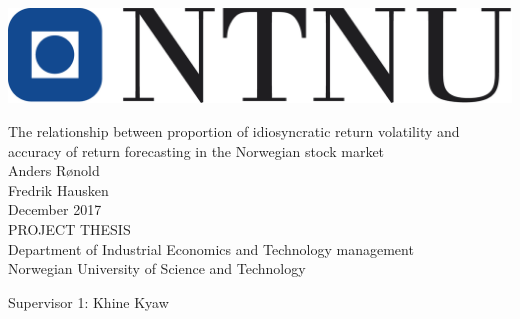 \thispagestyle{empty}
\includegraphics[scale=0.4]{Pictures/ntnu.png}
\mbox{}\\[6pc]
\begin{center}
\Huge{The relationship between proportion of idiosyncratic return volatility and accuracy of return forecasting in the Norwegian stock market}\\[2pc]

\Large{Anders Rønold \\ Fredrik Hausken}\\[1pc]
\large{December 2017}\\[2pc]

PROJECT THESIS\\
Department of Industrial Economics and Technology management\\
Norwegian University of Science and Technology
\end{center}
\vfill

\noindent Supervisor 1: Khine Kyaw


